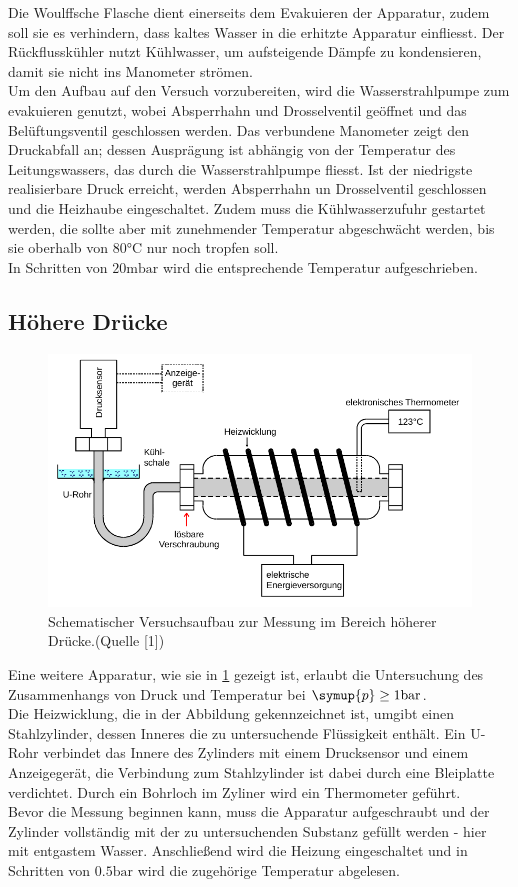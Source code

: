 Die Woulffsche Flasche dient einerseits dem Evakuieren der Apparatur, zudem soll sie es verhindern,
dass kaltes Wasser in die erhitzte Apparatur einfliesst. Der Rückflusskühler nutzt Kühlwasser, um
aufsteigende Dämpfe zu kondensieren, damit sie nicht ins Manometer strömen. \\
Um den Aufbau auf den Versuch vorzubereiten, wird die Wasserstrahlpumpe zum evakuieren genutzt,
wobei Absperrhahn und Drosselventil geöffnet und das Belüftungsventil geschlossen werden.
Das verbundene Manometer zeigt den Druckabfall an; dessen Ausprägung ist abhängig von der
Temperatur des Leitungswassers, das durch die Wasserstrahlpumpe fliesst. Ist der niedrigste realisierbare
Druck erreicht, werden Absperrhahn un Drosselventil geschlossen und die Heizhaube eingeschaltet.
Zudem muss die Kühlwasserzufuhr gestartet werden, die sollte aber mit zunehmender Temperatur abgeschwächt 
werden, bis sie oberhalb von $80 \si{\degreeCelsius}$ nur noch tropfen soll.\\
In Schritten von $20 \si{\milli\bar}$ wird die entsprechende Temperatur aufgeschrieben.

\subsection{Höhere Drücke}
\begin{figure}
    \centering
    \includegraphics[width=\textwidth]{apparatur2.png}
    \caption{Schematischer Versuchsaufbau zur Messung im Bereich höherer Drücke.(Quelle [1])}
    \label{fig:app2}
\end{figure}
\noindent Eine weitere Apparatur, wie sie in \ref{fig:app2} gezeigt ist, erlaubt die Untersuchung des Zusammenhangs
von Druck und Temperatur bei $\symup{p} \geq 1 \si{\bar}$.\\
Die Heizwicklung, die in der Abbildung gekennzeichnet ist, umgibt einen Stahlzylinder, dessen Inneres
die zu untersuchende Flüssigkeit enthält. Ein U-Rohr verbindet das Innere des Zylinders mit einem Drucksensor
und einem Anzeigegerät, die Verbindung zum Stahlzylinder ist dabei durch eine Bleiplatte 
verdichtet. Durch ein Bohrloch im Zyliner wird ein Thermometer geführt.\\
Bevor die Messung beginnen kann, muss die Apparatur aufgeschraubt und der Zylinder vollständig mit
der zu untersuchenden Substanz gefüllt werden - hier mit entgastem Wasser. Anschließend wird die Heizung
eingeschaltet und in Schritten von $0.5 \si{\bar}$ wird die zugehörige Temperatur abgelesen.